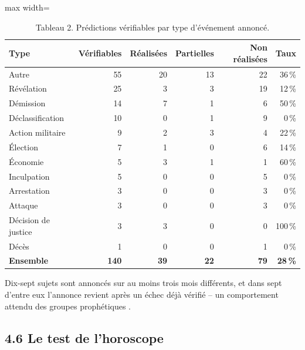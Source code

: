 \documentclass[11pt,a4paper]{article}
\begin{document}
\begin{table}[htbp]
\centering\small
\caption*{Tableau 2. Prédictions vérifiables par type d'événement annoncé.}
\begin{adjustbox}{max width=\linewidth}
\begin{tabular}{lrrrrr}
\toprule
\textbf{Type} & \textbf{Vérifiables} & \textbf{Réalisées} & \textbf{Partielles} & \textbf{Non réalisées} & \textbf{Taux} \\
\midrule
Autre & 55 & 20 & 13 & 22 & 36 \% \\
Révélation & 25 & 3 & 3 & 19 & 12 \% \\
Démission & 14 & 7 & 1 & 6 & 50 \% \\
Déclassification & 10 & 0 & 1 & 9 & 0 \% \\
Action militaire & 9 & 2 & 3 & 4 & 22 \% \\
Élection & 7 & 1 & 0 & 6 & 14 \% \\
Économie & 5 & 3 & 1 & 1 & 60 \% \\
Inculpation & 5 & 0 & 0 & 5 & 0 \% \\
Arrestation & 3 & 0 & 0 & 3 & 0 \% \\
Attaque & 3 & 0 & 0 & 3 & 0 \% \\
Décision de justice & 3 & 3 & 0 & 0 & 100 \% \\
Décès & 1 & 0 & 0 & 1 & 0 \% \\
\midrule
\textbf{Ensemble} & \textbf{140} & \textbf{39} & \textbf{22} & \textbf{79} & \textbf{28 \%} \\
\bottomrule
\end{tabular}
\end{adjustbox}
\end{table}

Dix-sept sujets sont annoncés sur au moins trois mois différents, et dans sept d'entre eux l'annonce revient après un échec déjà vérifié – un comportement attendu des groupes prophétiques \parencite{festinger1956when,westmark2022identifying}.

\subsection*{4.6 Le test de l'horoscope}
\end{document}
